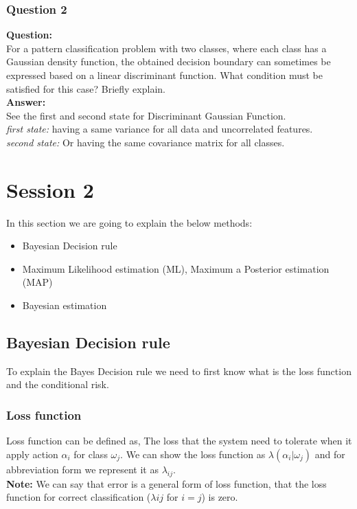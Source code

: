 \documentclass{article}
\begin{document}
\subsubsection{Question 2}
\textbf{Question:} \\
For a pattern classification problem with two classes, where each class has a
Gaussian density function, the obtained decision boundary can sometimes be
expressed based on a linear discriminant function. What condition must be satisfied
for this case? Briefly explain. \\
\textbf{Answer:} \\
See the first and second state for Discriminant Gaussian Function. \\
\textit{first state:} having a same variance for all data and uncorrelated features. \\
\textit{second state:} Or having the same covariance matrix for all classes.


\section{Session 2}
In this section we are going to explain the below methods:
\begin{itemize}
    \item Bayesian Decision rule
    \item Maximum Likelihood estimation (ML), Maximum a Posterior estimation (MAP)
    \item Bayesian estimation
\end{itemize}

\subsection{Bayesian Decision rule}
To explain the Bayes Decision rule we need to first know what is the loss function and the conditional risk.
\subsubsection{Loss function}
Loss function can be defined as, The loss that the system need to tolerate when it apply action $\alpha_i$ for class $\omega_j$. We can show the loss function as $\lambda(\alpha_i | \omega_j)$ and for abbreviation form we represent it as $\lambda_{ij}$. \\
\textbf{Note:} We can say that error is a general form of loss function, that the loss function for correct classification ($\lambda{ij}$ for $i=j$) is zero.
\end{document}
